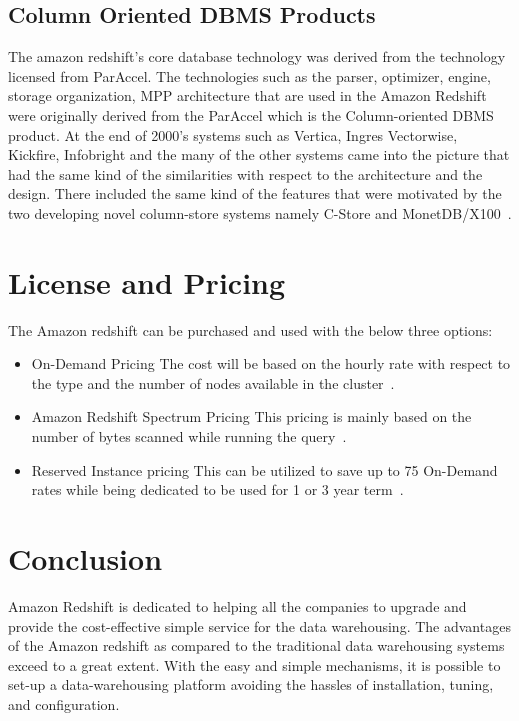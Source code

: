 	\subsection{Column Oriented DBMS Products}
	The amazon redshift's core database technology was derived from the 
	technology licensed from ParAccel. The technologies such as the parser, 
	optimizer, engine, storage organization, MPP architecture that are 
	used in the Amazon Redshift were originally derived from the ParAccel 
	which is the Column-oriented DBMS product. At the end of 2000's systems 
	such as Vertica, Ingres Vectorwise, Kickfire, Infobright and the 
	many of the other systems came into the picture that had the 
	same kind of the similarities with respect to the architecture and 
	the design. There included the same kind of the features that 
	were motivated by the two developing novel column-store 
	systems namely C-Store 
	and MonetDB/X100~\cite{hid-sp18-412_Gupta_2015_ARC}.

\section{License and Pricing}
\label{s:license}

	The Amazon redshift can be purchased and used with 
	the below three options:
	
	\begin{itemize}
	
	\item On-Demand Pricing 
	The cost will be based on the hourly rate with respect to 
	the type and the 
	number of nodes available 
	in the cluster~\cite{hid-sp18-412-Amazon_Redshift_Pricing}.
	
	\item Amazon Redshift Spectrum Pricing
	This pricing is mainly based on the number of bytes 
	scanned while running 
	the query~\cite{hid-sp18-412-Amazon_Redshift_Pricing}.
	
	\item Reserved Instance pricing
	This can be utilized to save up to 75%
	On-Demand rates while being dedicated to 
	be used for 
	1 or 3 year term~\cite{hid-sp18-412-Amazon_Redshift_Pricing}.
	
	\end{itemize}

\section{Conclusion}
\label{s:conclusion}
	Amazon Redshift is dedicated to helping all the 
	companies to upgrade and provide the cost-effective simple 
	service for the data warehousing. The advantages of the Amazon 
	redshift as compared to the traditional 
	data warehousing systems exceed to a great extent. With the easy and 
	simple mechanisms, it is possible to set-up a data-warehousing platform 
	avoiding the hassles of installation, tuning, and configuration.
    
